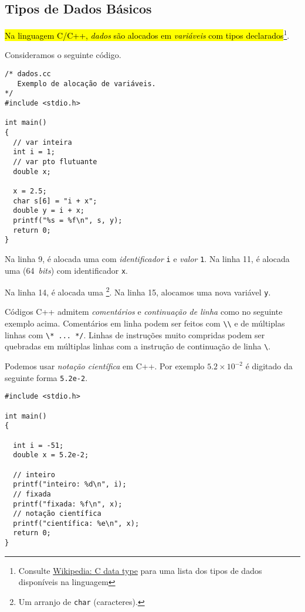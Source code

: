 \documentclass[12pt]{article}
\begin{document}
\subsection{Tipos de Dados Básicos}

\hl{Na linguagem C/C++, \emph{dados} são alocados em \emph{variáveis} com tipos declarados}\footnote{Consulte \href{https://en.wikipedia.org/wiki/C_data_types}{Wikipedia: C data type} para uma lista dos tipos de dados disponíveis na linguagem}.

\begin{ex}
  Consideramos o seguinte código.
\begin{lstlisting}[caption=dados.cc]
/* dados.cc
   Exemplo de alocação de variáveis.
*/
#include <stdio.h>

int main() 
{
  // var inteira
  int i = 1;
  // var pto flutuante
  double x;

  x = 2.5;
  char s[6] = "i + x";
  double y = i + x;
  printf("%s = %f\n", s, y);
  return 0;
}
\end{lstlisting}

  Na linha 9, é alocada uma  com \emph{identificador} \lstinline+i+ e \emph{valor} \lstinline+1+. Na linha 11, é alocada uma  (64~\textit{bits}) com identificador \lstinline+x+.

  Na linha 14, é alocada uma \footnote{Um arranjo de \lstinline+char+ (caracteres).}. Na linha 15, alocamos uma nova variável \lstinline+y+.
\end{ex}

\begin{obs}
  Códigos C++ admitem \emph{comentários} e \emph{continuação de linha} como no seguinte exemplo acima. Comentários em linha podem ser feitos com \lstinline+\\+ e de múltiplas linhas com \lstinline+\* ... */+. Linhas de instruções muito compridas podem ser quebradas em múltiplas linhas com a instrução de continuação de linha \lstinline+\+.
\end{obs}

\begin{obs}
  Podemos usar \emph{notação científica} em C++. Por exemplo $5.2\times 10^{-2}$ é digitado da seguinte forma \lstinline+5.2e-2+.

\begin{lstlisting}[caption=notacaoCientifica.cpp]
#include <stdio.h>

int main()
{

  int i = -51;
  double x = 5.2e-2;

  // inteiro
  printf("inteiro: %d\n", i);
  // fixada
  printf("fixada: %f\n", x);
  // notação científica
  printf("científica: %e\n", x);
  return 0;
}
\end{lstlisting}
\end{obs}
\end{document}
